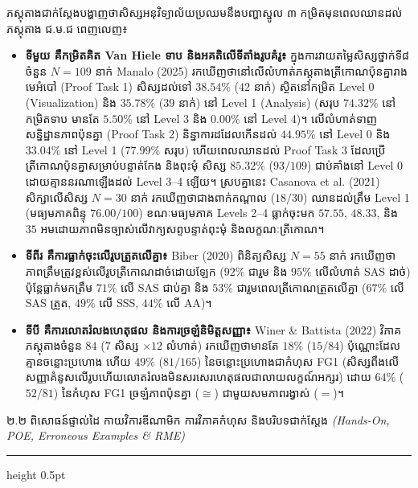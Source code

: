 \documentclass[a4paper,12pt]{article}
\newcommand{\en}[1]{{\TimesEn #1}}
\newcommand{\enit}[1]{{\TimesEn\textit{#1}}}
\newcommand{\cg}{\ensuremath{\cong}}
\newcommand{\subsec}[1]{%
  \Needspace{1.3cm}%
  \vspace{0pt}%
  {\muol\fontsize{11.5pt}{18.5pt}\selectfont #1}\par
  \vspace{1pt}\hrule height 0.5pt\vspace{2pt}%
}
\begin{document}
ភស្តុតាងជាក់ស្ដែងបង្ហាញថាសិស្សអនុវិទ្យាល័យប្រឈមនឹងបញ្ហាស្នូល ៣ កម្រិតមុនពេលឈានដល់ភស្តុតាង ជ.ម.ជ ពេញលេញ៖
\begin{itemize}[leftmargin=0.50cm, topsep=3pt, itemsep=4pt, parsep=0pt]
  \item \textbf{ទីមួយ គឺកម្រិតគិត \en{Van Hiele} ទាប និងអគតិលើទីតាំងរូបគំរូ៖} ក្នុងការវាយតម្លៃសិស្សថ្នាក់ទី៨ ចំនួន $N = 109$ នាក់ \en{Manalo (2025)} រកឃើញថានៅលើលំហាត់ភស្តុតាងត្រីកោណប៉ុនគ្នារាងមេអំបៅ (\en{Proof Task 1}) សិស្សដល់ទៅ $38.54\%$ ($42$ នាក់) ស្ថិតនៅកម្រិត \en{Level 0 (Visualization)} និង $35.78\%$ ($39$ នាក់) នៅ \en{Level 1 (Analysis)} (សរុប $74.32\%$ នៅកម្រិតទាប មានតែ $5.50\%$ នៅ \en{Level 3} និង $0.00\%$ នៅ \en{Level 4})។ លើលំហាត់ទាញសន្និដ្ឋានភាពប៉ុនគ្នា (\en{Proof Task 2}) និន្នាការដដែលកើនដល់ $44.95\%$ នៅ \en{Level 0} និង $33.04\%$ នៅ \en{Level 1} ($77.99\%$ សរុប) ហើយពេលឈានដល់ \en{Proof Task 3} ដែលប្រើត្រីកោណប៉ុនគ្នាសម្រាប់បន្ទាត់កែង និងពុះមុំ សិស្ស $85.32\%$ ($93/109$) ជាប់គាំងនៅ \en{Level 0} ដោយគ្មាននរណាឡើងដល់ \en{Level 3--4} ឡើយ។ ស្របគ្នានេះ \en{Casanova et al. (2021)} សិក្សាលើសិស្ស $N = 30$ នាក់ រកឃើញថាជាងពាក់កណ្ដាល ($18/30$) ឈានដល់ត្រឹម \en{Level 1} (មធ្យមភាគពិន្ទុ $76.00/100$) ខណៈមធ្យមភាគ \en{Levels 2--4} ធ្លាក់ចុះមក $57.55$, $48.33$, និង $35$ អមដោយភាពមិនច្បាស់លើវាក្យសព្ទបន្ទាត់ពុះមុំ និងលក្ខណៈត្រីកោណ។
  \item \textbf{ទីពីរ គឺការធ្លាក់ចុះលើរូបត្រួតលើគ្នា៖} \en{Biber (2020)} ពិនិត្យសិស្ស $N = 55$ នាក់ រកឃើញថាភាពត្រឹមត្រូវខ្ពស់លើរូបត្រីកោណដាច់ដោយឡែក ($92\%$ ជារួម និង $95\%$ លើលំហាត់ \en{SAS} ដាច់) ប៉ុន្តែធ្លាក់មកត្រឹម $71\%$ លើ \en{SAS} ជាប់គ្នា និង $53\%$ ជារួមពេលត្រីកោណត្រួតលើគ្នា ($67\%$ លើ \en{SAS} ត្រួត, $49\%$ លើ \en{SSS}, $44\%$ លើ \en{AA})។
  \item \textbf{ទីបី គឺការលោតរំលងហេតុផល និងការច្រឡំនិមិត្តសញ្ញា៖} \en{Winer \& Battista (2022)} វិភាគភស្តុតាងចំនួន $84$ ($7$ សិស្ស $\times 12$ លំហាត់) រកឃើញថាមានតែ $18\%$ ($15/84$) ប៉ុណ្ណោះដែលគ្មានចន្លោះប្រហោង ហើយ $49\%$ ($81/165$) នៃចន្លោះប្រហោងជាកំហុស \en{FG1} (សិស្សពឹងលើសញ្ញាគំនូសលើរូបហើយលោតរំលងមិនសរសេរហេតុផលជាលាយលក្ខណ៍អក្សរ) ដោយ $64\%$ ($52/81$) នៃកំហុស \en{FG1} ច្រឡំភាពប៉ុនគ្នា ($\cg$) ជាមួយសមភាពរង្វាស់ ($=$)។
\end{itemize}

\subsec{២.២ ពិសោធន៍ផ្ទាល់ដៃ កាយវិការឌីណាមិក ការវិភាគកំហុស និងបរិបទជាក់ស្ដែង \enit{(Hands-On, POE, Erroneous Examples \& RME)}}
\end{document}
